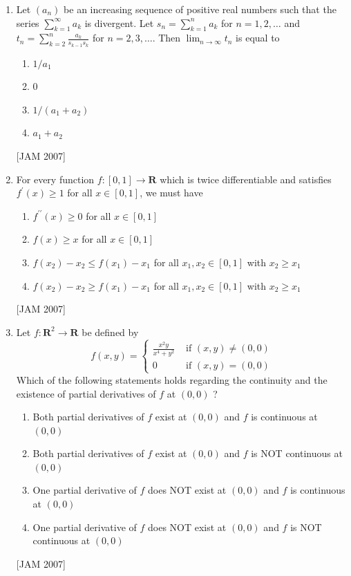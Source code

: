 \begin{enumerate}
 
\item  Let $\left(a_{n}\right)$ be an increasing sequence of positive real numbers such that the series $\sum_{k=1}^{\infty} a_{k}$ is divergent. Let $s_{n}=\sum_{k=1}^{n} a_{k}$ for $n=1,2, \ldots$ and $t_{n}=\sum_{k=2}^{n} \frac{a_{k}}{s_{k-1} s_{k}}$ for $n=2,3, \ldots$. Then $\lim _{n \rightarrow \infty} t_{n}$ is equal to
\begin{enumerate}
\item $1 / a_{1}$
\item 0
\item $1 /\left(a_{1}+a_{2}\right)$
\item $a_{1}+a_{2}$
\end{enumerate}
 \hfill [JAM 2007]




 
\item For every function $f:[0,1] \rightarrow \mathbf{R}$ which is twice differentiable and satisfies $f^{\prime}(x) \geq 1$ for all $x \in[0,1]$, we must have
\begin{enumerate}
  
\item $f^{\prime \prime}(x) \geq 0$ for all $x \in[0,1]$
\item $f(x) \geq x$ for all $x \in[0,1]$
\item $f\left(x_{2}\right)-x_{2} \leq f\left(x_{1}\right)-x_{1}$ for all $x_{1}, x_{2} \in[0,1]$ with $x_{2} \geq x_{1}$
\item $f\left(x_{2}\right)-x_{2} \geq f\left(x_{1}\right)-x_{1}$ for all $x_{1}, x_{2} \in[0,1]$ with $x_{2} \geq x_{1}$
\end{enumerate}
 \hfill [JAM 2007]


 

\item Let $f: \mathbf{R}^{2} \rightarrow \mathbf{R}$ be defined by
$$
f(x, y)=\left\{\begin{array}{cc}
\frac{x^{2} y}{x^{4}+y^{2}} & \text { if }(x, y) \neq(0,0) \\
0 & \text { if }(x, y)=(0,0)
\end{array}\right.
$$
Which of the following statements holds regarding the continuity and the existence of partial derivatives of $f$ at $(0,0)$ ?
\begin{enumerate}
  
\item Both partial derivatives of $f$ exist at $(0,0)$ and $f$ is continuous at $(0,0)$
\item Both partial derivatives of $f$ exist at $(0,0)$ and $f$ is NOT continuous at $(0,0)$
\item One partial derivative of $f$ does NOT exist at $(0,0)$ and $f$ is continuous at $(0,0)$
\item One partial derivative of $f$ does NOT exist at $(0,0)$ and $f$ is NOT continuous at $(0,0)$
\end{enumerate}
 \hfill [JAM 2007]




\end{enumerate}

